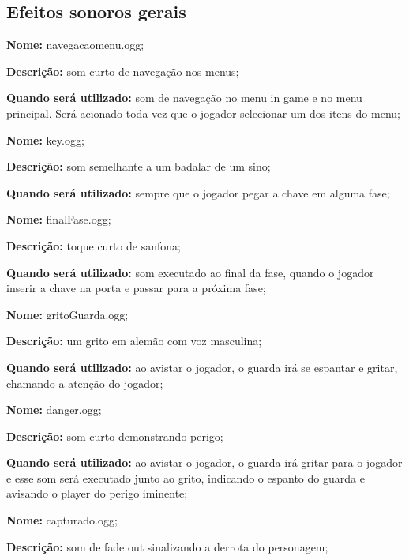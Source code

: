 \subsection{\label{efx}Efeitos sonoros gerais}
\begin{list}{}{}
\item\textbf{Nome: } navegacaomenu.ogg;

\textbf{Descrição: } som curto de navegação nos menus;

\textbf{Quando será utilizado: } som de navegação no menu in game e no menu principal. Será acionado toda vez que o jogador selecionar um dos itens do menu; \\


\item\textbf{Nome:} key.ogg;

\textbf{Descrição:} som semelhante a um badalar de um sino;

\textbf{Quando será utilizado:} sempre que o jogador pegar a chave em alguma fase; \\

\item\textbf{Nome:} finalFase.ogg;

\textbf{Descrição:} toque curto de sanfona;

\textbf{Quando será utilizado:} som executado ao final da fase, quando o jogador inserir a chave na porta e passar para a próxima fase; \\

\item\textbf{Nome:} gritoGuarda.ogg;

\textbf{Descrição:} um grito em alemão com voz masculina;

\textbf{Quando será utilizado:} ao avistar o jogador, o guarda irá se espantar e gritar, chamando a atenção do jogador;  \\

\item\textbf{Nome:} danger.ogg;

\textbf{Descrição:} som curto demonstrando perigo;

\textbf{Quando será utilizado:} ao avistar o jogador, o guarda irá gritar para o jogador e esse som será executado junto ao grito, indicando o espanto do guarda e avisando o player do perigo iminente; \\

\item\textbf{Nome:} capturado.ogg;

\textbf{Descrição:} som de fade out sinalizando a derrota do personagem;


\end{list}
